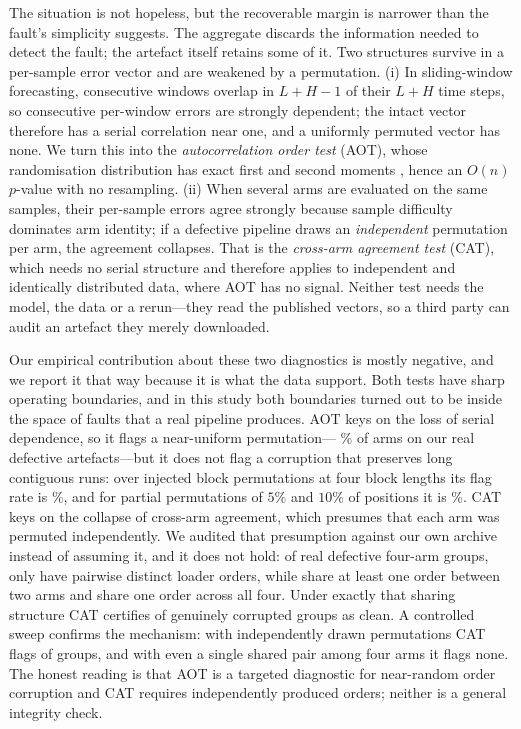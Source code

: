 \documentclass[a4paper,fleqn]{cas-sc}
\begin{document}
The situation is not hopeless, but the recoverable margin is narrower than the
fault's simplicity suggests. The aggregate discards the information needed to
detect the fault; the artefact itself retains some of it. Two
structures survive in a per-sample error vector and are weakened by a
permutation. (i) In sliding-window forecasting, consecutive windows overlap in
$L+H-1$ of their $L+H$ time steps, so consecutive per-window errors are strongly
dependent; the intact vector therefore has a serial correlation near one, and a
uniformly permuted vector has none. We turn this into the
\emph{autocorrelation order test}
(AOT), whose randomisation distribution has exact first and second moments
\citep{wald1943}, hence an $O(n)$ $p$-value with no resampling. (ii) When several
arms are evaluated on the same samples, their per-sample errors agree strongly
because sample difficulty dominates arm identity; if a defective pipeline draws an
\emph{independent} permutation per arm, the agreement collapses. That is the
\emph{cross-arm agreement test} (CAT), which needs no serial structure and
therefore applies to independent and identically distributed data, where AOT has
no signal. Neither test needs the model, the data or a rerun---they read the
published vectors, so a third party can audit an artefact they merely downloaded.

Our empirical contribution about these two diagnostics is mostly negative, and we
report it that way because it is what the data support. Both tests have
sharp operating boundaries, and in this study both boundaries turned out to be
inside the space of faults that a real pipeline produces. AOT keys on the loss of
serial dependence, so it flags a near-uniform permutation---%
\NumObsAotFlagPct\% of arms on our real defective artefacts---but it does not
flag a corruption that preserves long contiguous runs: over injected block
permutations at four block lengths its flag rate is
\NumSensFlagBlockMax\%, and for partial permutations of $5\%$ and $10\%$ of
positions it is \NumSensFlagPartialMildMax\%. CAT keys on the collapse of
cross-arm agreement, which presumes that each arm was permuted independently. We
audited that presumption against our own archive instead of assuming it, and it
does not hold: of \NumObsPermGroups{} real defective four-arm groups, only
\NumObsPermAllDistinct{} have pairwise distinct loader orders, while
\NumObsPermPartialShared{} share at least one order between two arms and
\NumObsPermAllIdentical{} share one order across all four. Under exactly that
sharing structure CAT certifies \NumObsCatCertGroups{} of
\NumObsPermGroups{} genuinely corrupted groups as clean. A controlled sweep
confirms the mechanism: with independently drawn permutations CAT flags
\NumCatCondGroups{} of \NumCatCondGroups{} groups, and with even a single shared
pair among four arms it flags none. The honest reading is that AOT is a
targeted diagnostic for near-random order corruption and CAT requires
independently produced orders; neither is a general integrity check.
\end{document}
